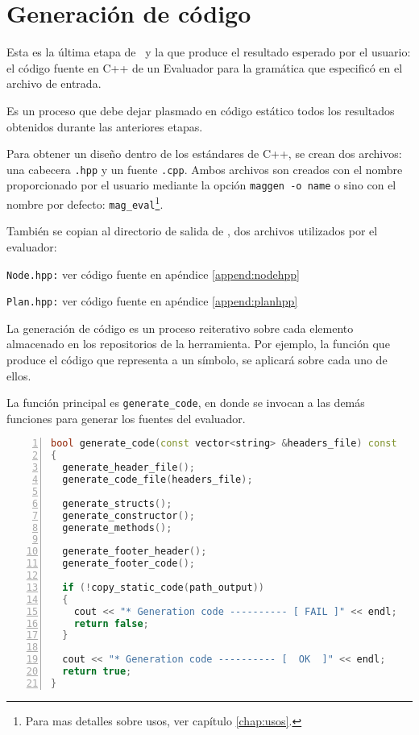 \section{Generación de código}

Esta es la última etapa de \maggen\ y la que produce el resultado esperado por el usuario: el código fuente en C++ de un Evaluador para la gramática que especificó en el archivo de entrada.

Es un proceso que debe dejar plasmado en código estático todos los resultados obtenidos durante las anteriores etapas.

Para obtener un diseño dentro de los estándares de C++, se crean dos archivos: una cabecera \texttt{.hpp} y un fuente \texttt{.cpp}. Ambos archivos son creados con el nombre proporcionado por el usuario mediante la opción \texttt{maggen -o name} o sino con el nombre por defecto: \texttt{mag\_eval}\footnote{Para mas detalles sobre usos, ver capítulo \ref{chap:usos}.}.

También se copian al directorio de salida de \maggen, dos archivos utilizados por el evaluador:
\begin{items}
\item \texttt{Node.hpp:} ver código fuente en apéndice \ref{append:nodehpp}
\item \texttt{Plan.hpp:} ver código fuente en apéndice \ref{append:planhpp}
\end{items}

\vspace*{0.2cm}

La generación de código es un proceso reiterativo sobre cada elemento almacenado en los repositorios de la herramienta. Por ejemplo, la función que produce el código que representa a un símbolo, se aplicará sobre cada uno de ellos.

La función principal es \texttt{generate\_code}, en donde se invocan a las demás funciones para generar los fuentes del evaluador.

\vspace*{0.2cm}

\begin{lstlisting}[language=C++, basicstyle=\scriptsize, numbers=left, columns=fullflexible, linewidth=10cm]
bool generate_code(const vector<string> &headers_file) const
{
  generate_header_file();
  generate_code_file(headers_file);

  generate_structs();
  generate_constructor();
  generate_methods();

  generate_footer_header();
  generate_footer_code();

  if (!copy_static_code(path_output))
  {
    cout << "* Generation code ---------- [ FAIL ]" << endl;
    return false;
  }

  cout << "* Generation code ---------- [  OK  ]" << endl;
  return true;
}
\end{lstlisting}

